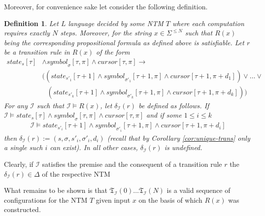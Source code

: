 \documentclass [11pt]{article}
\newtheorem{definition}[theorem]{Definition}
\newcommand{\sym}[3]{\textit{symbol}_{#1}[#2,#3]}
\newcommand{\cursor}[2]{\textit{cursor}[#1,#2]}
\newcommand{\state}[2]{\textit{state}_{#1}[#2]}
\newcommand{\trans}[1]{\mathfrak{T}_{\mathcal{#1}}}
\begin{document}
 
Moreover, for convenience sake let consider the following definition.

 
 
\begin{definition}
Let $L$ language decided by some NTM $T$ where each computation requires exactly $N$ steps. Moreover, for the string $x \in \Sigma^{\leq N}$ such that $R(x)$  being the corresponding propositional formula as defined above is satisfiable.
Let $r$ be a transition rule in $R(x)$ of the form 
\begin{equation*}
\begin{split}
\state{s}{\tau}& \wedge \sym{\sigma}{\tau}{\pi} \wedge \cursor{\tau}{\pi} \to \\
& \Big(({\state{s'_1}{\tau+1}}\wedge \sym{\sigma'_1}{\tau+1}{\pi} \wedge {\cursor{\tau+1}{\pi+d_1}} ) \vee \dots \vee \\
& \; \; \,  ({\state{s'_k}{\tau+1}} \wedge \sym{\sigma'_k}{\tau+1}{\pi} \wedge {\cursor{\tau+1}{\pi+d_k}} ) \Big)
\end{split}
\end{equation*}
For any $\mathcal{I}$ such that $\mathcal{I} \models R(x)$, let $\delta_{\mathcal{I}}(r)$ be defined as follows.
If $\mathcal{I} \models \state{s}{\tau} \wedge \sym{\sigma}{\tau}{\pi} \wedge \cursor{\tau}{\pi}$ and if some $1 \leq i \leq k$
\begin{equation*}
\begin{split}
 \mathcal{I} \models \state{s'_i}{\tau+1} \wedge \sym{\sigma'_i}{\tau+1}{\pi} \wedge \cursor{\tau+1}{\pi+d_i}
\end{split}
\end{equation*}
then $\delta_{\mathcal{I}}(r):= (s,\sigma, s'_i,\sigma'_i, d_i)$ (recall that by Corollary \ref{cor:unique-trans} only a single such $i$ can exist).
In all other cases, $\delta_{\mathcal{I}}(r)$ is undefined.
\end{definition}

Clearly, if $\mathcal{I}$ satisfies the premise and the consequent of a transition rule $r$ the $\delta_{\mathcal{I}}(r) \in \Delta$ of the respective NTM

\bigskip

What remains to be shown is that $\trans{I}(0)\dots \trans{I}(N)$ is a valid sequence of configurations for the NTM $T$ given input $x$ on the basis of which $R(x)$ was constructed.
\end{document}
